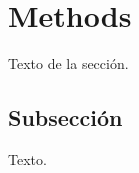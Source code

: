 %

\section{Methods}
\label{sec:methods}

Texto de la sección.

%

\subsection{Subsección}
\label{sec:methods-sub}

Texto.
